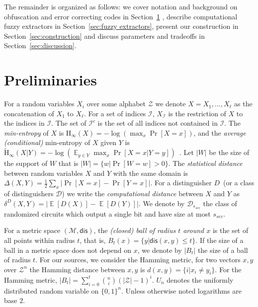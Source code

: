 \documentclass[11pt]{article}
\newcommand{\secref}[1]{\mbox{Section~\ref{#1}}}
\DeclareMathOperator*{\expe}{\mathbb{E}}
\newcommand{\dis}{\ensuremath{\mathsf{dis}}}
\newcommand{\Hoo}{\mathrm{H}_\infty}
\newcommand{\Hav}{\tilde{\mathrm{H}}_\infty}
\newcommand{\authnote}[2]{{\textcolor{red}{\textsf{#1 notes: }\textcolor{blue}{ #2}}\marginpar{\textcolor{red}{\textbf{!!!!!}}}}}
\newcommand{\authnote}[2]{}
\newcommand{\bnote}[1]{{\authnote{Ben}{#1}}}
\begin{document}
The remainder is organized as follows: we cover notation and background on obfuscation and error correcting codes in \secref{sec:preliminaries} , describe computational fuzzy extractors in \secref{sec:fuzzy extractors}, present our construction in \secref{sec:construction} and discuss parameters and tradeoffs in \secref{sec:discussion}.

\section{Preliminaries}
\label{sec:preliminaries}
For a random variables $X_i$ over some alphabet $\mathcal{Z}$ we denote $X = X_1,..., X_\ell$ as the concatenation of $X_1$ to $X_\ell$.  For a set of indices $\mathcal{I}$,  $X_{\mathcal{I}}$ is the restriction of $X$ to the indices in $\mathcal{I}$.  The set of $\mathcal{I}^c$ is the set of all indices not contained in $\mathcal{I}$.  The {\em min-entropy} of $X$ is $\Hoo(X) = -\log(\max_x \Pr[X=x])$, 
and the {\em average (conditional)} min-entropy of $X$ given $Y$ is  $\Hav(X|Y) = -\log(\expe_{y\in Y} \max_{x} \Pr[X=x|Y=y])$~\cite[Section 2.4]{DBLP:journals/siamcomp/DodisORS08}.   Let $|W|$ be the size of the support of $W$ that is $|W| = \{w | \Pr[W=w]>0\}$.
The {\em statistical distance} between random variables $X$ and $Y$ with the same domain is $\Delta(X,Y) = \frac12 \sum_x |\Pr[X=x] - \Pr[Y=x]|$. 
For a distinguisher $D$~(or a class of distinguishers $\mathcal{D}$) we write the \emph{computational distance} between $X$ and $Y$ as $\delta^D(X,Y) = \left| \expe[D(X)]-\expe[D(Y)]\right |$.  We denote by $\mathcal{D}_{s_{sec}}$ the class of randomized circuits which output a single bit and have size at most $s_{sec}$.

For a metric space $(\mathcal{M}, \dis)$, the \emph{(closed) ball of radius $t$ around $x$} is the set of all points within radius $t$, that is, $B_t(x) = \{y| \dis(x, y)\leq t\}$.  If the size of a ball in a metric space does not depend on $x$, we denote by $|B_t|$ the size of a ball of radius $t$.  For our sources, we consider the Hamming metric, for two vectors $x, y$ over $\mathcal{Z}^n$ the Hamming distance between $x,y$ is $d(x,y) = \{i | x_i \neq y_i\}$.  For the Hamming metric, $|B_t| = \sum_{i=0}^t {n \choose i} (|\mathcal{Z}|-1)^i $.  $U_n$ denotes the uniformly  distributed random variable on $\{0,1\}^n$.  Unless otherwise noted logarithms are base $2$.
\end{document}
